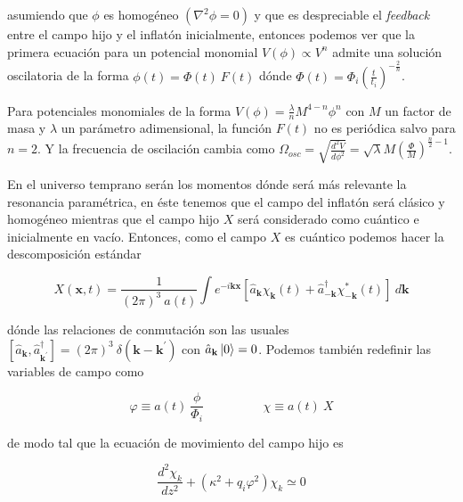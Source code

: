 \noindent
asumiendo que $\phi$ es homogéneo $(\nabla^2 \phi = 0)$ y que es despreciable el \textit{feedback} entre el campo hijo y el inflatón inicialmente, entonces podemos ver que la primera ecuación para un potencial monomial $V (\phi) \propto V^n$ admite una solución oscilatoria de la forma $\phi (t) = \Phi (t) \ F(t)$ dónde $\Phi (t) = \displaystyle \Phi_i \left( \frac{t}{t_i} \right)^{\displaystyle - \frac{2}{n}}$. 

Para potenciales monomiales de la forma $\displaystyle V(\phi) = \frac{\lambda}{n} M^{4 - n} \phi^n$ con $M$ un factor de masa y $\lambda$ un parámetro adimensional, la función $F(t)$ no es periódica salvo para $n = 2$. Y la frecuencia de oscilación cambia como $\Omega_{osc} = \displaystyle \sqrt{\frac{d^2 V}{d\phi^2}} = \sqrt{\lambda} M \left( \frac{\Phi}{M} \right)^{\displaystyle \frac{n}{2} - 1}$.

En el universo temprano serán los momentos dónde será más relevante la resonancia paramétrica, en éste tenemos que el campo del inflatón será clásico y homogéneo mientras que el campo hijo $X$ será considerado como cuántico e inicialmente en vacío. Entonces, como el campo $X$ es cuántico podemos hacer la descomposición estándar

\begin{equation}
    X (\textbf{x}, t) = \frac{1}{(2 \pi)^3 \ a(t)} \int e^{- i \textbf{k} \textbf{x}} \left[ \hat{a}_\textbf{k} \chi_\textbf{k} (t) + \hat{a}_{- \textbf{k}}^\dagger \chi^*_{-\textbf{k}} (t) \right] \ d \textbf{k}
\end{equation}

\noindent
dónde las relaciones de conmutación son las usuales $\displaystyle \left[ \hat{a}_{\textbf{k}}, \hat{a}_{\textbf{k}^\prime}^\dagger \right] = (2\pi)^3 \ \delta (\textbf{k} - \textbf{k}^\prime)$ con $\hat{a}_\textbf{k} \ket{0} = 0$. Podemos también redefinir las variables de campo como

\begin{equation}
    \varphi \equiv a(t) \ \frac{\phi}{\Phi_i} \hspace{2cm} \chi \equiv a(t) \ X
\end{equation}

\noindent
de modo tal que la ecuación de movimiento del campo hijo es

\begin{equation}
    \frac{d^2 \chi_k}{dz^2} + \left( \kappa^2 + q_i \varphi^2 \right) \chi_k \simeq 0
\end{equation}

